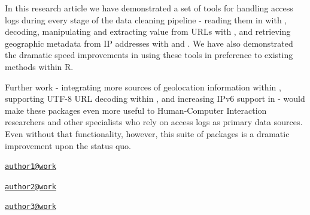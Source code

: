 In this research article we have demonstrated a set of tools for
handling access logs during every stage of the data cleaning pipeline -
reading them in with , decoding, manipulating and
extracting value from URLs with , and retrieving
geographic metadata from IP addresses with  and
. We have also demonstrated the dramatic speed
improvements in using these tools in preference to existing methods
within R.

Further work - integrating more sources of geolocation information
within , supporting UTF-8 URL decoding within
, and increasing IPv6 support in  - would
make these packages even more useful to Human-Computer Interaction
researchers and other specialists who rely on access logs as primary
data sources. Even without that functionality, however, this suite of
packages is a dramatic improvement upon the status quo.



\address{%
Oliver Keyes\\
Wikimedia Foundation\\
line 1\\ line 2\\
}
\href{mailto:author1@work}{\nolinkurl{author1@work}}

\address{%
Bob Rudis\\
Rapid7\\
line 1\\ line 2\\
}
\href{mailto:author2@work}{\nolinkurl{author2@work}}

\address{%
Jay Jacobs\\
Magical Python Land\\
line 1\\ line 2\\
}
\href{mailto:author3@work}{\nolinkurl{author3@work}}

